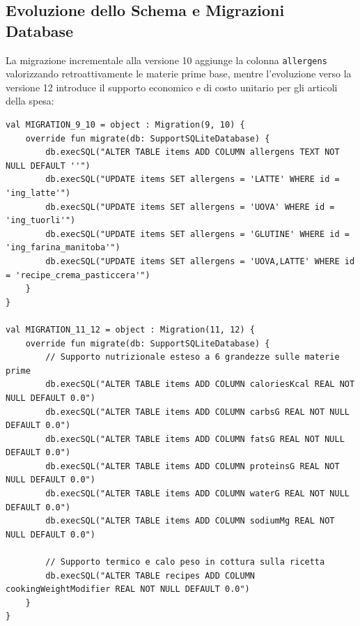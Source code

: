 \documentclass[11pt,a4paper,titlepage]{article}
\begin{document}
\subsection{Evoluzione dello Schema e Migrazioni Database}
La migrazione incrementale alla versione 10 aggiunge la colonna \texttt{allergens} valorizzando retroattivamente le materie prime base, mentre l'evoluzione verso la versione 12 introduce il supporto economico e di costo unitario per gli articoli della spesa:
\begin{lstlisting}[caption={Dichiarazione migrazioni SQL in AppDatabase}]
val MIGRATION_9_10 = object : Migration(9, 10) {
    override fun migrate(db: SupportSQLiteDatabase) {
        db.execSQL("ALTER TABLE items ADD COLUMN allergens TEXT NOT NULL DEFAULT ''")
        db.execSQL("UPDATE items SET allergens = 'LATTE' WHERE id = 'ing_latte'")
        db.execSQL("UPDATE items SET allergens = 'UOVA' WHERE id = 'ing_tuorli'")
        db.execSQL("UPDATE items SET allergens = 'GLUTINE' WHERE id = 'ing_farina_manitoba'")
        db.execSQL("UPDATE items SET allergens = 'UOVA,LATTE' WHERE id = 'recipe_crema_pasticcera'")
    }
}

val MIGRATION_11_12 = object : Migration(11, 12) {
    override fun migrate(db: SupportSQLiteDatabase) {
        // Supporto nutrizionale esteso a 6 grandezze sulle materie prime
        db.execSQL("ALTER TABLE items ADD COLUMN caloriesKcal REAL NOT NULL DEFAULT 0.0")
        db.execSQL("ALTER TABLE items ADD COLUMN carbsG REAL NOT NULL DEFAULT 0.0")
        db.execSQL("ALTER TABLE items ADD COLUMN fatsG REAL NOT NULL DEFAULT 0.0")
        db.execSQL("ALTER TABLE items ADD COLUMN proteinsG REAL NOT NULL DEFAULT 0.0")
        db.execSQL("ALTER TABLE items ADD COLUMN waterG REAL NOT NULL DEFAULT 0.0")
        db.execSQL("ALTER TABLE items ADD COLUMN sodiumMg REAL NOT NULL DEFAULT 0.0")

        // Supporto termico e calo peso in cottura sulla ricetta
        db.execSQL("ALTER TABLE recipes ADD COLUMN cookingWeightModifier REAL NOT NULL DEFAULT 0.0")
    }
}
\end{lstlisting}
\end{document}
